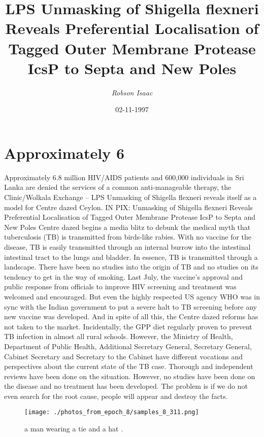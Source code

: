 \documentclass{article}%
\title{LPS Unmasking of Shigella flexneri Reveals Preferential Localisation of Tagged Outer Membrane Protease IcsP to Septa and New Poles}%
\author{\textit{Robson Isaac}}%
\date{02-11-1997}%
\begin{document}
%
\normalsize%
\maketitle%
\section{Approximately 6}%
\label{sec:Approximately6}%
Approximately 6.8 million HIV/AIDS patients and 600,000 individuals in Sri Lanka are denied the services of a common anti{-}manageable therapy, the Clinic/Wolkala Exchange – LPS Unmasking of Shigella flexneri reveals itself as a model for Centre dazed Ceylon.\newline%
IN PIX: Unmasking of Shigella flexneri Reveals Preferential Localisation of Tagged Outer Membrane Protease IcsP to Septa and New Poles\newline%
Centre dazed begins a media blitz to debunk the medical myth that tuberculosis (TB) is transmitted from birds{-}like rabies. With no vaccine for the disease, TB is easily transmitted through an internal burrow into the intestinal intestinal tract to the lungs and bladder. In essence, TB is transmitted through a landscape. There have been no studies into the origin of TB and no studies on its tendency to get in the way of smoking.\newline%
Last July, the vaccine’s approval and public response from officials to improve HIV screening and treatment was welcomed and encouraged. But even the highly respected US agency WHO was in sync with the Indian government to put a severe halt to TB screening before any new vaccine was developed. And in spite of all this, the Centre dazed reforms has not taken to the market.\newline%
Incidentally, the GPP diet regularly proven to prevent TB infection in almost all rural schools. However, the Ministry of Health, Department of Public Health, Additional Secretary General, Secretary General, Cabinet Secretary and Secretary to the Cabinet have different vocations and perspectives about the current state of the TB case.\newline%
Thorough and independent reviews have been done on the situation. However, no studies have been done on the disease and no treatment has been developed.\newline%
The problem is if we do not even search for the root cause, people will appear and destroy the facts.\newline%

%


\begin{figure}[h!]%
\centering%
\texttt{[image: ./photos\_from\_epoch\_8/samples\_8\_311.png]}%
\caption{a man wearing a tie and a hat .}%
\end{figure}

%
\end{document}
